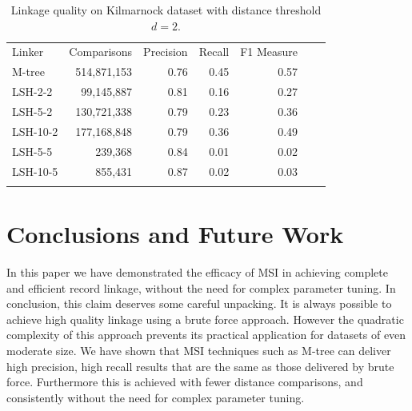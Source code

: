 \documentclass{llncs}
\begin{document}
\begin{table}[ht]
\caption{Linkage quality on Kilmarnock dataset with distance
threshold $d= 2$.}
\label{comparison-of-results-demography-kili}
\centering
\begin{footnotesize}
\begin{tabular}{lrrrrrr} \hline\noalign{\smallskip}
\parbox{0.2\textwidth}{\centering Linker} &
\parbox{0.2\textwidth}{\centering Comparisons} &
\parbox{0.17\textwidth}{\centering Precision} &
\parbox{0.17\textwidth}{\centering Recall} &
\parbox{0.17\textwidth}{\centering F1 Measure} \\
\noalign{\smallskip} \hline \noalign{\smallskip}
M-tree     & 514,871,153                   & 0.76      & 0.45   & 0.57      \\
\noalign{\smallskip} \hline \noalign{\smallskip}
LSH-2-2   & 99,145,887                    & 0.81      & 0.16   & 0.27       \\
LSH-5-2   & 130,721,338                   & 0.79      & 0.23   & 0.36       \\
LSH-10-2  & 177,168,848                   & 0.79      & 0.36   & 0.49       \\
LSH-5-5   & 239,368                      & 0.84      & 0.01   & 0.02       \\
LSH-10-5  & 855,431                      & 0.87      & 0.02   & 0.03 \\ 
\noalign{\smallskip} \hline
\end{tabular}
\end{footnotesize}
\end{table}


\section{Conclusions and Future Work\label{sec-concl}}

In this paper we have demonstrated the efficacy of MSI in achieving
complete and efficient record linkage, without the need for complex
parameter tuning. In conclusion, this claim deserves some careful
unpacking. It is always possible to achieve high quality linkage using a
brute force approach. However the quadratic complexity of this approach
prevents its practical application for datasets of even moderate size.
We have shown that MSI techniques such as M-tree can deliver high
precision, high recall results that are the same as those delivered by
brute force. Furthermore this is achieved with fewer distance
comparisons, and consistently without the need for complex parameter
tuning.
\end{document}
